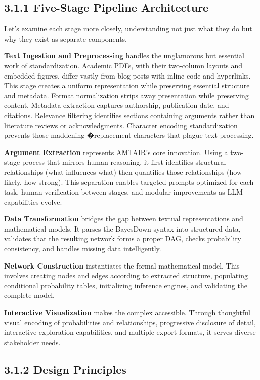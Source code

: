 \documentclass[
  11pt,
  letterpaper,
]{book}
\begin{document}
\subsection{3.1.1 Five-Stage Pipeline
Architecture}\label{sec-five-stage-pipeline}

Let's examine each stage more closely, understanding not just what they
do but why they exist as separate components.

\textbf{Text Ingestion and Preprocessing} handles the unglamorous but
essential work of standardization. Academic PDFs, with their two-column
layouts and embedded figures, differ vastly from blog posts with inline
code and hyperlinks. This stage creates a uniform representation while
preserving essential structure and metadata. Format normalization strips
away presentation while preserving content. Metadata extraction captures
authorship, publication date, and citations. Relevance filtering
identifies sections containing arguments rather than literature reviews
or acknowledgments. Character encoding standardization prevents those
maddening �replacement characters that plague text processing.

\textbf{Argument Extraction} represents AMTAIR's core innovation. Using
a two-stage process that mirrors human reasoning, it first identifies
structural relationships (what influences what) then quantifies those
relationships (how likely, how strong). This separation enables targeted
prompts optimized for each task, human verification between stages, and
modular improvements as LLM capabilities evolve.

\textbf{Data Transformation} bridges the gap between textual
representations and mathematical models. It parses the BayesDown syntax
into structured data, validates that the resulting network forms a
proper DAG, checks probability consistency, and handles missing data
intelligently.

\textbf{Network Construction} instantiates the formal mathematical
model. This involves creating nodes and edges according to extracted
structure, populating conditional probability tables, initializing
inference engines, and validating the complete model.

\textbf{Interactive Visualization} makes the complex accessible. Through
thoughtful visual encoding of probabilities and relationships,
progressive disclosure of detail, interactive exploration capabilities,
and multiple export formats, it serves diverse stakeholder needs.

\subsection{3.1.2 Design Principles}\label{sec-design-principles}
\end{document}
